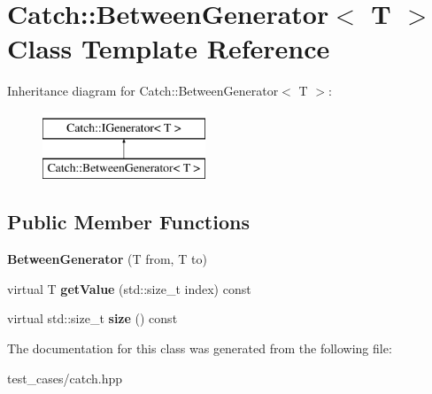 \hypertarget{classCatch_1_1BetweenGenerator}{}\section{Catch\+:\+:Between\+Generator$<$ T $>$ Class Template Reference}
\label{classCatch_1_1BetweenGenerator}
Inheritance diagram for Catch\+:\+:Between\+Generator$<$ T $>$\+:\begin{figure}[H]
\begin{center}
\leavevmode
\includegraphics[height=2.000000cm]{classCatch_1_1BetweenGenerator}
\end{center}
\end{figure}
\subsection*{Public Member Functions}
\begin{DoxyCompactItemize}
\item 
\mbox{\label{classCatch_1_1BetweenGenerator_a835a057d691ae37caef660624099b51c}} 
{\bfseries Between\+Generator} (T from, T to)
\item 
\mbox{\label{classCatch_1_1BetweenGenerator_a913f74bb0c23b3bc0127abfffdabbd94}} 
virtual T {\bfseries get\+Value} (std\+::size\+\_\+t index) const
\item 
\mbox{\label{classCatch_1_1BetweenGenerator_af65a1fe51f9b1106fc676e3dd189adb6}} 
virtual std\+::size\+\_\+t {\bfseries size} () const
\end{DoxyCompactItemize}


The documentation for this class was generated from the following file\+:\begin{DoxyCompactItemize}
\item 
test\+\_\+cases/catch.\+hpp\end{DoxyCompactItemize}
